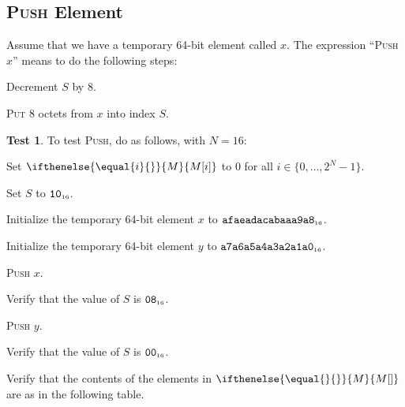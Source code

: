 \documentclass[a4paper,12pt]{article}
\newcommand{\num}[1]{\texttt{\MakeLowercase{#1}}}
\newcommand{\hex}[1]{\num{#1}_{\textup{\tiny 16}}}
\newcommand{\MEM}[1]{\ifthenelse{\equal{#1}{}}{M}{M[#1]}}
\newcommand{\SP}{S}
\newcommand{\range}[2]{\{#1,\ldots,#2\}}
\newcommand{\proc}[1]{\textsc{#1}}
\theoremstyle{definition}
\newtheorem{test}{Test}
\begin{document}
\subsection{\proc{Push} Element}

Assume that we have a temporary 64-bit element called $x$.
The expression ``\proc{Push} $x$'' means to do the following steps:
\begin{stepnumbers}
\item Decrement $\SP$ by 8.
\item \proc{Put} 8 octets from $x$ into index $\SP$.
\end{stepnumbers}

\begin{test}
  To test \proc{Push}, do as follows, with $N=16$:
  \begin{stepnumbers}
  \item Set $\MEM{i}$ to 0 for all $i \in \range{0}{2^N-1}$.
  \item Set $\SP$ to $\hex{10}$.
  \item Initialize the temporary 64-bit element $x$ to $\hex{AFAEADACABAAA9A8}$.
  \item Initialize the temporary 64-bit element $y$ to $\hex{A7A6A5A4A3A2A1A0}$.
  \item \proc{Push} $x$.
  \item Verify that the value of $\SP$ is $\hex{08}$.
  \item \proc{Push} $y$.
  \item Verify that the value of $\SP$ is $\hex{00}$.
  \item Verify that the contents of the elements in $\MEM{}$ are as in the following table.
  \end{stepnumbers}


\end{test}
\end{document}
